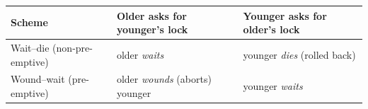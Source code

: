 \begin{center}
\renewcommand{\arraystretch}{1.35}
\begin{tabularx}{\linewidth}{@{}l X X@{}}
\toprule
\textbf{Scheme} & \textbf{Older asks for younger's lock} & \textbf{Younger asks for older's lock} \\
\midrule
Wait–die (non-pre-emptive) & older \emph{waits} & younger \emph{dies} (rolled back) \\
Wound–wait (pre-emptive) & older \emph{wounds} (aborts) younger & younger \emph{waits} \\
\bottomrule
\end{tabularx}
\end{center}
